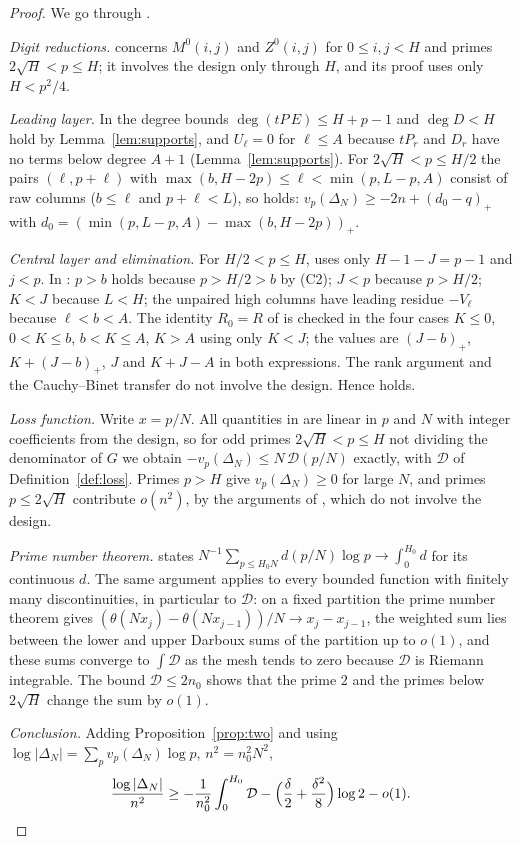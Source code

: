 \documentclass[11pt]{article}
\theoremstyle{definition}
\newcommand{\pos}[1]{\left(#1\right)_{+}}
\newcommand{\Dl}{\mathcal{D}}
\begin{document}
\begin{proof}
We go through \cite[Sec.~3]{OAI}.

\emph{Digit reductions.} \cite[Lemma~3.1]{OAI} concerns $M^0(i,j)$ and $Z^0(i,j)$ for $0\le i,j<H$ and primes $2\sqrt H<p\le H$; it involves the design only through $H$, and its proof uses only $H<p^2/4$.

\emph{Leading layer.} In \cite[Eqs.~(36)--(37)]{OAI} the degree bounds $\deg(tP\,E)\le H+p-1$ and $\deg D<H$ hold by Lemma~\ref{lem:supports}, and $U_\ell=0$ for $\ell\le A$ because $tP_r$ and $D_r$ have no terms below degree $A+1$ (Lemma~\ref{lem:supports}). For $2\sqrt H<p\le H/2$ the pairs $(\ell,p+\ell)$ with $\max(b,H-2p)\le\ell<\min(p,L-p,A)$ consist of raw columns ($b\le\ell$ and $p+\ell<L$), so \cite[Eq.~(38)]{OAI} holds: $v_p(\Delta_N)\ge-2n+\pos{d_0-q}$ with $d_0=\pos{\min(p,L-p,A)-\max(b,H-2p)}$.

\emph{Central layer and elimination.} For $H/2<p\le H$, \cite[Lemma~3.2]{OAI} uses only $H-1-J=p-1$ and $j<p$. In \cite[Lemma~3.3]{OAI}: $p>b$ holds because $p>H/2>b$ by (C2); $J<p$ because $p>H/2$; $K<J$ because $L<H$; the unpaired high columns have leading residue $-V_\ell$ because $\ell<b<A$. The identity $R_0=R$ of \cite[Eq.~(41)]{OAI} is checked in the four cases $K\le0$, $0<K\le b$, $b<K\le A$, $K>A$ using only $K<J$; the values are $\pos{J-b}$, $K+\pos{J-b}$, $J$ and $K+J-A$ in both expressions. The rank argument and the Cauchy--Binet transfer do not involve the design. Hence \cite[Eq.~(40)]{OAI} holds.

\emph{Loss function.} Write $x=p/N$. All quantities in \cite[Eqs.~(38), (40)]{OAI} are linear in $p$ and $N$ with integer coefficients from the design, so for odd primes $2\sqrt H<p\le H$ not dividing the denominator of $G$ we obtain $-v_p(\Delta_N)\le N\,\Dl(p/N)$ exactly, with $\Dl$ of Definition~\ref{def:loss}. Primes $p>H$ give $v_p(\Delta_N)\ge0$ for large $N$, and primes $p\le2\sqrt H$ contribute $o(n^2)$, by the arguments of \cite[Sec.~3.4]{OAI}, which do not involve the design.

\emph{Prime number theorem.} \cite[Eq.~(45)]{OAI} states $N^{-1}\sum_{p\le H_0N}d(p/N)\log p\to\int_0^{H_0}d$ for its continuous $d$. The same argument applies to every bounded function with finitely many discontinuities, in particular to $\Dl$: on a fixed partition the prime number theorem gives $(\theta(Nx_j)-\theta(Nx_{j-1}))/N\to x_j-x_{j-1}$, the weighted sum lies between the lower and upper Darboux sums of the partition up to $o(1)$, and these sums converge to $\int \Dl$ as the mesh tends to zero because $\Dl$ is Riemann integrable. The bound $\Dl\le2n_0$ shows that the prime $2$ and the primes below $2\sqrt H$ change the sum by $o(1)$.

\emph{Conclusion.} Adding Proposition~\ref{prop:two} and using $\log|\Delta_N|=\sum_pv_p(\Delta_N)\log p$, $n^2=n_0^2N^2$,
\[
\frac{\log|\Delta_N|}{n^2}\ge-\frac{1}{n_0^2}\int_0^{H_0}\Dl-\Big(\frac\delta2+\frac{\delta^2}8\Big)\log2-o(1).\qedhere
\]
\end{proof}
\end{document}
